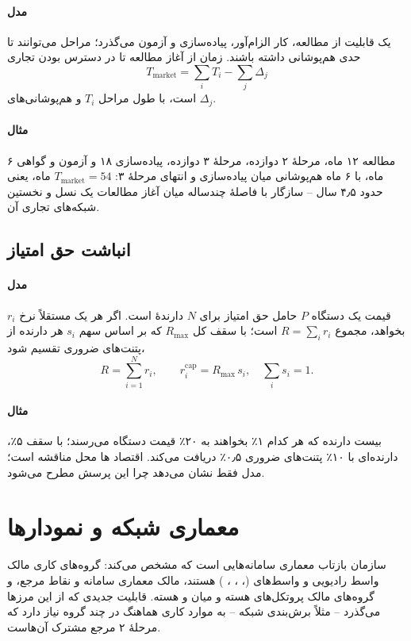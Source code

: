 \documentclass[11pt,a4paper]{article}
\begin{document}
\paragraph{مدل} یک قابلیت از مطالعه، کار الزام‌آور، پیاده‌سازی و آزمون می‌گذرد؛ مراحل می‌توانند تا حدی هم‌پوشانی داشته
باشند. زمان از آغاز مطالعه تا در دسترس بودن تجاری
\begin{equation}\label{eq:ttm}
  T_{\mathrm{market}} = \sum_{i} T_i - \sum_{j} \Delta_j
\end{equation}
است، با طول مراحل $T_i$ و هم‌پوشانی‌های $\Delta_j$.
\paragraph{مثال} مطالعه ۱۲ ماه، مرحلهٔ ۲ دوازده، مرحلهٔ ۳ دوازده، پیاده‌سازی ۱۸ و آزمون و گواهی ۶ ماه، با ۶ ماه هم‌پوشانی میان
پیاده‌سازی و انتهای مرحلهٔ ۳: $T_{\mathrm{market}} = 54$ ماه، یعنی حدود ۴٫۵ سال -- سازگار با فاصلهٔ چندساله میان آغاز مطالعات
یک نسل و نخستین شبکه‌های تجاری آن.

\subsection{انباشت حق امتیاز}\label{sec:stack}
\paragraph{مدل} قیمت یک دستگاه $P$ حامل حق امتیاز برای $N$ دارندهٔ  است. اگر هر یک مستقلاً نرخ $r_i$ بخواهد، مجموع
$R = \sum_i r_i$ است؛ با سقف کل $R_{\max}$ که بر اساس سهم $s_i$ هر دارنده از پتنت‌های ضروری تقسیم شود،
\begin{equation}\label{eq:stack}
  R = \sum_{i=1}^{N} r_i, \qquad r_i^{\mathrm{cap}} = R_{\max}\, s_i, \quad \sum_i s_i = 1 .
\end{equation}
\paragraph{مثال} بیست دارنده که هر کدام ۱٪ بخواهند به ۲۰٪ قیمت دستگاه می‌رسند؛ با سقف ۵٪، دارنده‌ای با ۱۰٪ پتنت‌های ضروری
۰٫۵٪ دریافت می‌کند. اقتصاد ها محل مناقشه است؛ مدل فقط نشان می‌دهد چرا این پرسش مطرح می‌شود.

\section{معماری شبکه و نمودارها}
سازمان  بازتاب معماری سامانه‌هایی است که مشخص می‌کند: گروه‌های کاری  مالک واسط رادیویی و واسط‌های
 (، ، ، ) هستند،  مالک معماری سامانه و نقاط مرجع، و گروه‌های 
مالک پروتکل‌های هسته و  میان  و هسته. قابلیت جدیدی که از این مرزها می‌گذرد -- مثلاً برش‌بندی شبکه -- به
موارد کاری هماهنگ در چند گروه نیاز دارد که مرحلهٔ ۲  مرجع مشترک آن‌هاست.
\end{document}
